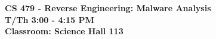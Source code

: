 \documentclass[12pt]{article}
\begin{document}
\begin{center}
{\bf CS 479 - Reverse Engineering: Malware Analysis  \\  T/Th 3:00 - 4:15 PM \\ Classroom:  Science Hall 113  
}
\end{center}








\end{document}
